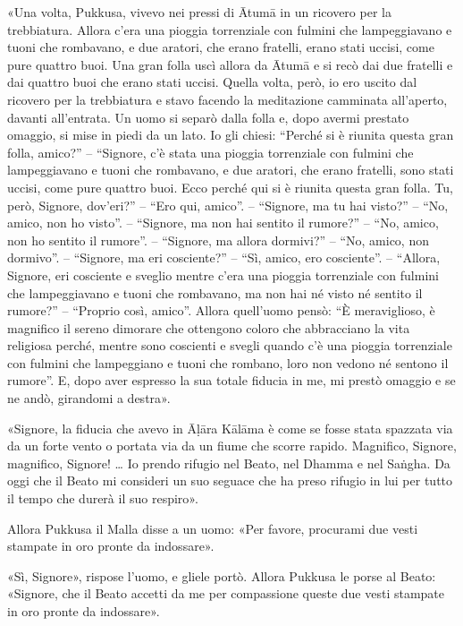 «Una volta, Pukkusa, vivevo nei pressi di Ātumā in un ricovero per la
trebbiatura. Allora c’era una pioggia torrenziale con fulmini che
lampeggiavano e tuoni che rombavano, e due aratori, che erano fratelli,
erano stati uccisi, come pure quattro buoi. Una gran folla uscì allora
da Ātumā e si recò dai due fratelli e dai quattro buoi che erano stati
uccisi. Quella volta, però, io ero uscito dal ricovero per la
trebbiatura e stavo facendo la meditazione camminata all’aperto, davanti
all’entrata. Un uomo si separò dalla folla e, dopo avermi prestato
omaggio, si mise in piedi da un lato. Io gli chiesi: “Perché si è
riunita questa gran folla, amico?” – “Signore, c’è stata una pioggia
torrenziale con fulmini che lampeggiavano e tuoni che rombavano, e due
aratori, che erano fratelli, sono stati uccisi, come pure quattro buoi.
Ecco perché qui si è riunita questa gran folla. Tu, però, Signore,
dov’eri?” – “Ero qui, amico”. – “Signore, ma tu hai visto?” – “No,
amico, non ho visto”. – “Signore, ma non hai sentito il rumore?” – “No,
amico, non ho sentito il rumore”. – “Signore, ma allora dormivi?” – “No,
amico, non dormivo”. – “Signore, ma eri cosciente?” – “Sì, amico, ero
cosciente”. – “Allora, Signore, eri cosciente e sveglio mentre c’era una
pioggia torrenziale con fulmini che lampeggiavano e tuoni che rombavano,
ma non hai né visto né sentito il rumore?” – “Proprio così, amico”.
Allora quell’uomo pensò: “È meraviglioso, è magnifico il sereno dimorare
che ottengono coloro che abbracciano la vita religiosa perché, mentre
sono coscienti e svegli quando c’è una pioggia torrenziale con fulmini
che lampeggiano e tuoni che rombano, loro non vedono né sentono il
rumore”. E, dopo aver espresso la sua totale fiducia in me, mi prestò
omaggio e se ne andò, girandomi a destra».


«Signore, la fiducia che avevo in Āḷāra Kālāma è come se fosse stata
spazzata via da un forte vento o portata via da un fiume che scorre
rapido. Magnifico, Signore, magnifico, Signore! … Io prendo rifugio nel
Beato, nel Dhamma e nel Saṅgha. Da oggi che il Beato mi consideri un suo
seguace che ha preso rifugio in lui per tutto il tempo che durerà il suo
respiro».


Allora Pukkusa il Malla disse a un uomo: «Per favore, procurami due
vesti stampate in oro pronte da indossare».


«Sì, Signore», rispose l’uomo, e gliele portò. Allora Pukkusa le porse
al Beato: «Signore, che il Beato accetti da me per compassione queste
due vesti stampate in oro pronte da indossare».


